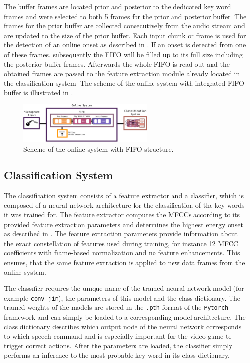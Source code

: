 The buffer frames are located prior and posterior to the dedicated key word frames and were selected to both 5 frames for the prior and posterior buffer.
The frames for the prior buffer are collected consecutively from the audio stream and are updated to the size of the prior buffer. 
Each input chunk or frame is used for the detection of an online onset as described in .
If an onset is detected from one of these frames, subsequently the FIFO will be filled up to its full size including the posterior buffer frames.
Afterwards the whole FIFO is read out and the obtained frames are passed to the feature extraction module already located in the classification system.
The scheme of the online system with integrated FIFO buffer is illustrated in .
\begin{figure}[!ht]
  \centering
  \includegraphics[width=0.60\textwidth]{./6_game/figs/game_system_online.pdf}
  \caption{Scheme of the online system with FIFO structure.}
  \label{fig:game_system_online}
\end{figure}
\FloatBarrier
\noindent



\subsection{Classification System}
The classification system consists of a feature extractor and a classifier, which is composed of a neural network architecture for the classification of the key words it was trained for.
The feature extractor computes the MFCCs according to its provided feature extraction parameters and determines the highest energy onset as described in .
The feature extraction parameters provide information about the exact constellation of features used during training, for instance 12 MFCC coefficients with frame-based normalization and no feature enhancements.
This ensures, that the same feature extraction is applied to new data frames from the online system.

The classifier requires the unique name of the trained neural network model (for example \texttt{conv-jim}), the parameters of this model and the class dictionary.
The trained weights of the  models are stored in the \texttt{.pth} format of the \texttt{Pytorch} framework and can simply be loaded to a corresponding model architecture.
The class dictionary describes which output node of the neural network corresponds to which speech command and is especially important for the video game to trigger correct actions.
After the parameters are loaded, the classifier simply performs an inference to the most probable key word in its class dictionary.

